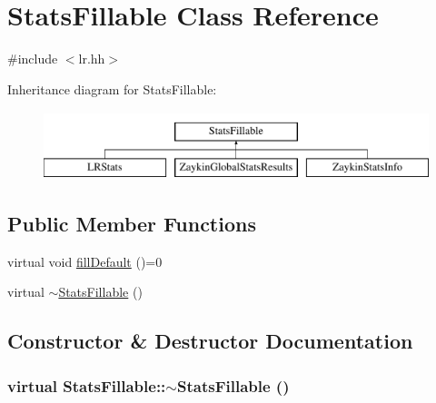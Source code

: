 \hypertarget{classStatsFillable}{
\section{StatsFillable Class Reference}
\label{classStatsFillable}
}


{\ttfamily \#include $<$lr.hh$>$}

Inheritance diagram for StatsFillable:\begin{figure}[H]
\begin{center}
\leavevmode
\includegraphics[height=2cm]{classStatsFillable}
\end{center}
\end{figure}
\subsection*{Public Member Functions}
\begin{DoxyCompactItemize}
\item 
virtual void \hyperlink{classStatsFillable_a6bc1a66ea949a078faa1b9ccdac54aba}{fillDefault} ()=0
\item 
virtual \hyperlink{classStatsFillable_a0a63c1e4b93f2614cb4b52bfd0b5c37c}{$\sim$StatsFillable} ()
\end{DoxyCompactItemize}


\subsection{Constructor \& Destructor Documentation}
\hypertarget{classStatsFillable_a0a63c1e4b93f2614cb4b52bfd0b5c37c}{
\subsubsection[{$\sim$StatsFillable}]{\setlength{\rightskip}{0pt plus 5cm}virtual StatsFillable::$\sim$StatsFillable ()}}
\label{classStatsFillable_a0a63c1e4b93f2614cb4b52bfd0b5c37c}


